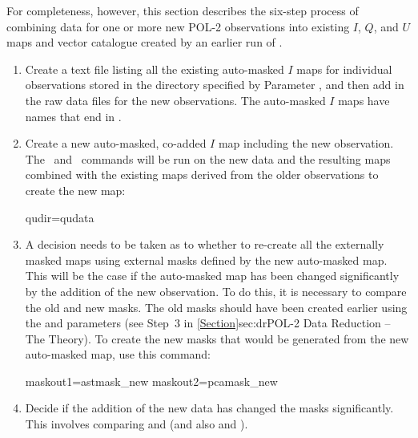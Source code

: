 For completeness, however, this section describes the six-step process of
combining data for one or more new POL-2 observations into existing $I$, $Q$,
and $U$ maps and vector catalogue created by an earlier run of .
\begin{enumerate}

\item Create a text file listing all the existing auto-masked $I$ maps
  for individual observations stored in the directory specified by
  Parameter , and then add in the raw data files for the new
  observations. The auto-masked $I$ maps have names that end in
  .

\begin{terminalv}
\end{terminalv}


\item Create a new auto-masked, co-added $I$ map including the new
  observation. The \calcqu\ and \makemap\ commands   will be run on the new
  data and the resulting maps combined with the existing maps derived
  from the older observations to create the new map:

\begin{terminalv}
     qudir=qudata
\end{terminalv}


\item A decision needs to be taken as to whether to re-create all the
  externally masked maps using external masks defined by the new
  auto-masked map. This will be the case if the auto-masked map has
  been changed significantly by the addition of the new
  observation. To do this, it is necessary to compare the old and new
  masks. The old masks should have been created earlier using the
   and  parameters (see Step~3 in
  \cref{Section}{sec:dr}{POL-2 Data Reduction -- The Theory}). To
  create the new masks that would be generated from the new
  auto-masked map, use this command:

\begin{terminalv}
     maskout1=astmask_new  maskout2=pcamask_new
\end{terminalv}

\item Decide if the addition of the new data has changed the masks
  significantly. This involves comparing  and
   (and also  and
  ).



\end{enumerate}
